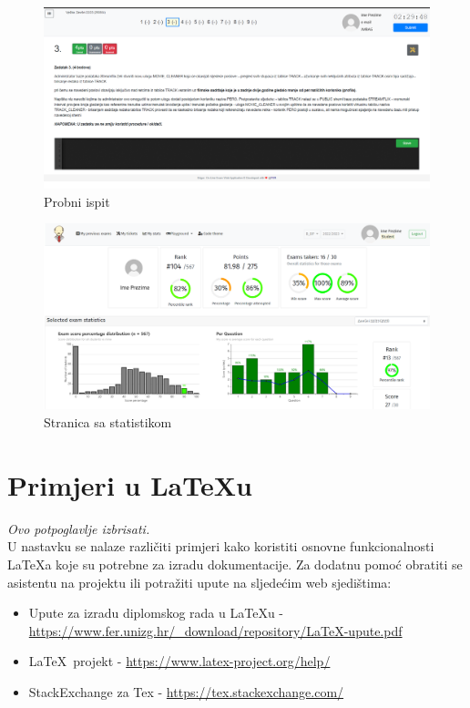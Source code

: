 		\begin{figure}[H]
			\includegraphics[scale=0.4]{slike/edgar3}
			\centering
			\caption{Probni ispit}
			\label{fig:ispit}
		\end{figure}
		
		\begin{figure}[H]
			\includegraphics[scale=0.4]{slike/edgar2}
			\centering
			\caption{Stranica sa statistikom}
			\label{fig:stats}
		\end{figure}
		
		\eject

		
		
		\section{Primjeri u \LaTeX u}
		
		\textit{Ovo potpoglavlje izbrisati.}\\

		U nastavku se nalaze različiti primjeri kako koristiti osnovne funkcionalnosti \LaTeX a koje su potrebne za izradu dokumentacije. Za dodatnu pomoć obratiti se asistentu na projektu ili potražiti upute na sljedećim web sjedištima:
		\begin{itemize}
			\item Upute za izradu diplomskog rada u \LaTeX u - \url{https://www.fer.unizg.hr/_download/repository/LaTeX-upute.pdf}
			\item \LaTeX\ projekt - \url{https://www.latex-project.org/help/}
			\item StackExchange za Tex - \url{https://tex.stackexchange.com/}\\
		
		\end{itemize} 	


